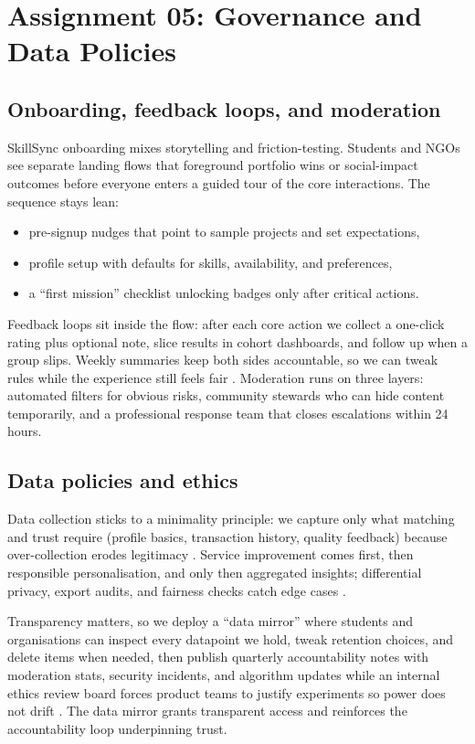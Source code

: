\section*{Assignment 05: Governance and Data Policies}

\subsection*{Onboarding, feedback loops, and moderation}
SkillSync onboarding mixes storytelling and friction-testing. Students and NGOs see separate landing flows that foreground portfolio wins or social-impact outcomes before everyone enters a guided tour of the core interactions. The sequence stays lean:
\begin{itemize}
  \item pre-signup nudges that point to sample projects and set expectations,
  \item profile setup with defaults for skills, availability, and preferences,
  \item a ``first mission'' checklist unlocking badges only after critical actions.
\end{itemize}

Feedback loops sit inside the flow: after each core action we collect a one-click rating plus optional note, slice results in cohort dashboards, and follow up when a group slips. Weekly summaries keep both sides accountable, so we can tweak rules while the experience still feels fair \citep{Reillier2017}. Moderation runs on three layers: automated filters for obvious risks, community stewards who can hide content temporarily, and a professional response team that closes escalations within 24 hours.

\subsection*{Data policies and ethics}
Data collection sticks to a minimality principle: we capture only what matching and trust require (profile basics, transaction history, quality feedback) because over-collection erodes legitimacy \citep{Zuboff2019}. Service improvement comes first, then responsible personalisation, and only then aggregated insights; differential privacy, export audits, and fairness checks catch edge cases \citep{Srnicek2017}.

Transparency matters, so we deploy a ``data mirror'' where students and organisations can inspect every datapoint we hold, tweak retention choices, and delete items when needed, then publish quarterly accountability notes with moderation stats, security incidents, and algorithm updates while an internal ethics review board forces product teams to justify experiments so power does not drift \citep{Choudary2016,Lecture10}. The data mirror grants transparent access and reinforces the accountability loop underpinning trust.

